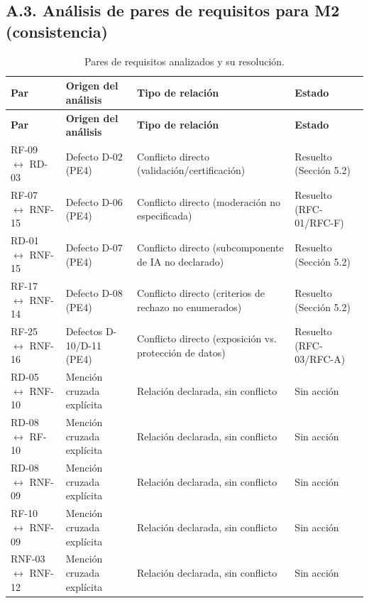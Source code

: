 \documentclass[11pt]{article}
\begin{document}
	\subsection*{A.3. Análisis de pares de requisitos para M2 (consistencia)}
	
	\begin{longtable}{L{3cm} L{3.5cm} L{3.5cm} L{2.5cm}}
		\caption{Pares de requisitos analizados y su resolución.}\label{tab:pares-m2}\\
		\toprule
		\textbf{Par} & \textbf{Origen del análisis} & \textbf{Tipo de relación} & \textbf{Estado} \\
		\midrule
		\endfirsthead
		\toprule
		\textbf{Par} & \textbf{Origen del análisis} & \textbf{Tipo de relación} & \textbf{Estado} \\
		\midrule
		\endhead
		\bottomrule
		\endfoot
		RF-09 $\leftrightarrow$ RD-03 & Defecto D-02 (PE4) & Conflicto directo (validación/certificación) & Resuelto (Sección 5.2) \\
		\addlinespace
		RF-07 $\leftrightarrow$ RNF-15 & Defecto D-06 (PE4) & Conflicto directo (moderación no especificada) & Resuelto (RFC-01/RFC-F) \\
		\addlinespace
		RD-01 $\leftrightarrow$ RNF-15 & Defecto D-07 (PE4) & Conflicto directo (subcomponente de IA no declarado) & Resuelto (Sección 5.2) \\
		\addlinespace
		RF-17 $\leftrightarrow$ RNF-14 & Defecto D-08 (PE4) & Conflicto directo (criterios de rechazo no enumerados) & Resuelto (Sección 5.2) \\
		\addlinespace
		RF-25 $\leftrightarrow$ RNF-16 & Defectos D-10/D-11 (PE4) & Conflicto directo (exposición vs. protección de datos) & Resuelto (RFC-03/RFC-A) \\
		\addlinespace
		RD-05 $\leftrightarrow$ RNF-10 & Mención cruzada explícita & Relación declarada, sin conflicto & Sin acción \\
		\addlinespace
		RD-08 $\leftrightarrow$ RF-10 & Mención cruzada explícita & Relación declarada, sin conflicto & Sin acción \\
		\addlinespace
		RD-08 $\leftrightarrow$ RNF-09 & Mención cruzada explícita & Relación declarada, sin conflicto & Sin acción \\
		\addlinespace
		RF-10 $\leftrightarrow$ RNF-09 & Mención cruzada explícita & Relación declarada, sin conflicto & Sin acción \\
		\addlinespace
		RNF-03 $\leftrightarrow$ RNF-12 & Mención cruzada explícita & Relación declarada, sin conflicto & Sin acción \\
	\end{longtable}
	
\end{document}
